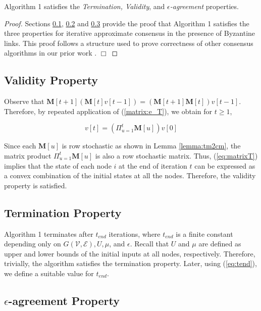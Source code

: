 \documentclass{llncs}
\newcommand{\fillbox}{\hspace*{\fill}\(\Box\)}
\newcommand{\scripte}{\mathcal{E}}
\newcommand{\scriptv}{\mathcal{V}}
\newcommand{\matrixm}{\textbf{M}}
\begin{document}
\begin{theorem}
\label{thm:correctness}
Algorithm 1 satisfies the {\em Termination, Validity}, and {\em $\epsilon$-agreement} properties.
\end{theorem}

\begin{proof}
Sections \ref{s:validity}, \ref{s:termination} and \ref{s:agreement} provide the proof that Algorithm 1 satisfies the three properties for iterative approximate consensus in the presence of Byzantine links. This proof follows a structure used to prove correctness
of other consensus algorithms in our prior work \cite{Tseng_general,vaidya_icdcn14}.
\fillbox
\end{proof}


\subsection{Validity Property}
\label{s:validity}

Observe that $\matrixm[t+1](\matrixm[t] v[t-1]) = (\matrixm[t+1]\matrixm[t]) v[t-1]$. Therefore, by repeated application of (\ref{matrix:e_T}), we obtain for $t \geq 1$,

\begin{equation}
\label{eq:matrixT}
v[t] = (\Pi_{u = 1}^t \matrixm[u]) v[0]
\end{equation}

Since each $\matrixm[u]$ is row stochastic as shown in Lemma \ref{lemma:tm2cm}, the matrix product $\Pi_{u=1}^t \matrixm[u]$ is also a row stochastic matrix. Thus, (\ref{eq:matrixT}) implies that the state of each node $i$ at the end of iteration $t$ can be expressed as a convex combination of the initial states at all the nodes. Therefore, the validity property is satisfied.

\subsection{Termination Property}
\label{s:termination}

Algorithm 1 terminates after $t_{end}$ iterations, where $t_{end}$ is a finite constant depending only on $G(\scriptv, \scripte), U, \mu$, and $\epsilon$. Recall that $U$ and $\mu$ are defined as upper and lower bounds of the initial inputs at all nodes, respectively. Therefore, trivially, the algorithm satisfies the termination property. Later, using (\ref{eq:tend}), we define a suitable value for $t_{end}$.


\subsection{$\epsilon$-agreement Property}
\label{s:agreement}
\end{document}
